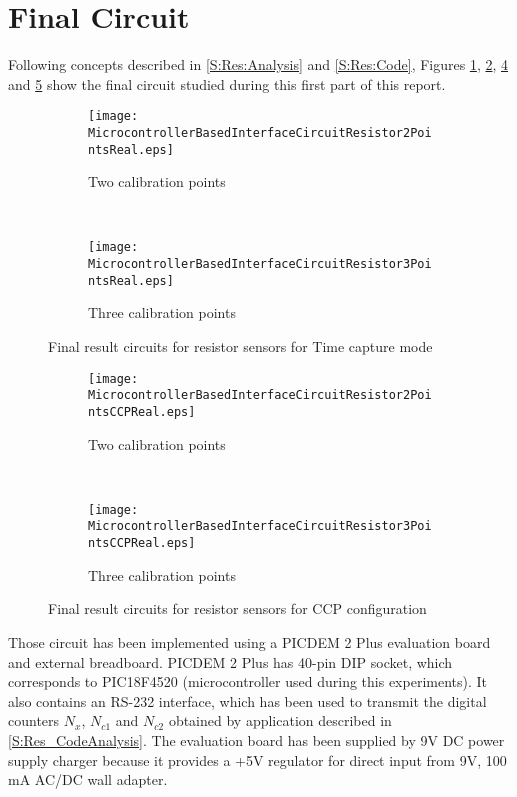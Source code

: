 \section{Final Circuit}\label{S:Res:Circuit}
Following concepts described in \ref{S:Res:Analysis} and \ref{S:Res:Code}, Figures \ref{fig:uR2PointsReal}, \ref{fig:uR3PointsReal}, \ref{fig:uR2PointsCCPReal} and \ref{fig:uR3PointsCCPReal} show the final circuit studied during this first part of this report.
\medskip

\begin{figure}[!ht]
\centering
	\begin{subfigure}{0.45\textwidth}
	\texttt{[image: MicrocontrollerBasedInterfaceCircuitResistor2PointsReal.eps]}
	\caption{Two calibration points}
	\label{fig:uR2PointsReal}
	\end{subfigure}
	~
	\begin{subfigure}{0.45\textwidth}
	\centering
	\texttt{[image: MicrocontrollerBasedInterfaceCircuitResistor3PointsReal.eps]}
	\caption{Three calibration points}
	\label{fig:uR3PointsReal}
	\end{subfigure}
\caption{Final result circuits for resistor sensors for Time capture mode}
\label{fig:FinalCircuits}
\end{figure}

\begin{figure}[!ht]
\centering
	\begin{subfigure}{0.45\textwidth}
	\centering
	\texttt{[image: MicrocontrollerBasedInterfaceCircuitResistor2PointsCCPReal.eps]}
	\caption{Two calibration points}
	\label{fig:uR2PointsCCPReal}
	\end{subfigure}
	~
	\begin{subfigure}{0.45\textwidth}
	\centering
	\texttt{[image: MicrocontrollerBasedInterfaceCircuitResistor3PointsCCPReal.eps]}
	\caption{Three calibration points}
	\label{fig:uR3PointsCCPReal}
	\end{subfigure}
\caption{Final result circuits for resistor sensors for CCP configuration}
\label{fig:FinalCircuitsCCP}
\end{figure}

Those circuit has been implemented using a PICDEM 2 Plus evaluation board and external breadboard. PICDEM 2 Plus has 40-pin DIP socket, which corresponds to PIC18F4520 (microcontroller used during this experiments). It also contains an RS-232 interface, which has been used to transmit the digital counters $N_{x}$, $N_{c1}$ and $N_{c2}$ obtained by application described in \ref{S:Res_CodeAnalysis}. The evaluation board has been supplied by 9V DC power supply charger because it provides a +5V regulator for direct input from 9V, 100 mA AC/DC wall adapter.
\medskip

